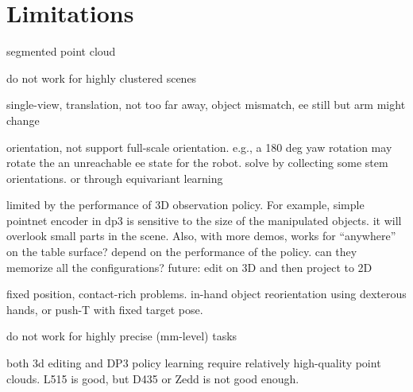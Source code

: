 \section{Limitations}
segmented point cloud

do not work for highly clustered scenes

single-view, translation, not too far away, object mismatch, ee still but arm might change

orientation,  not support full-scale orientation. e.g., a 180 deg yaw rotation may rotate the an unreachable ee state for the robot. solve by collecting some stem orientations. or through equivariant learning

limited by the performance of 3D observation policy. For example, simple pointnet encoder in dp3 is sensitive to the size of the manipulated objects. it will overlook small parts in the scene.
Also, with more demos, \method works for ``anywhere'' on the table surface? depend on the performance of the policy. can they memorize all the configurations? 
future: edit on 3D and then project to 2D

fixed position, contact-rich problems. in-hand object reorientation using dexterous hands, or push-T with fixed target pose.

do not work for highly precise (mm-level) tasks 

both 3d editing and DP3 policy learning require relatively high-quality point clouds. L515 is good, but D435 or Zedd is not good enough.